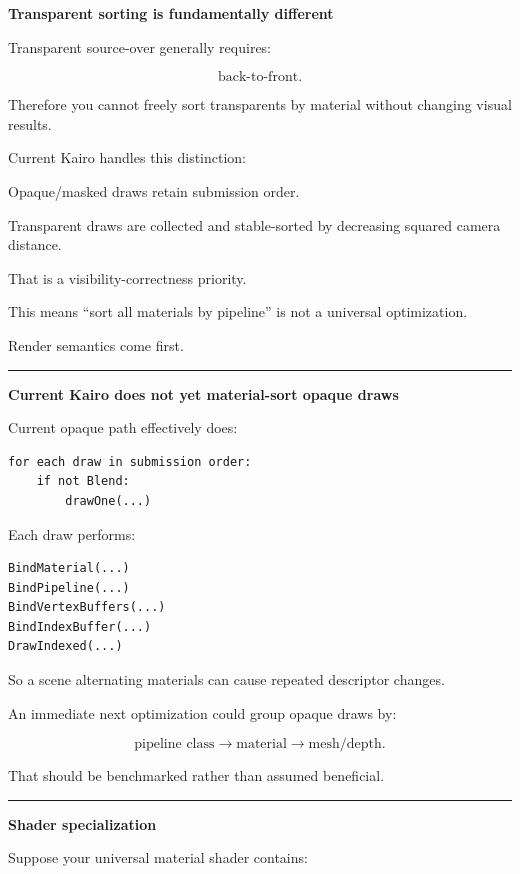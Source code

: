 \textbf{Transparent sorting is fundamentally different}

Transparent source-over generally requires:

\[
\text{back-to-front}.
\]

Therefore you cannot freely sort transparents by material without changing visual results.

Current Kairo handles this distinction:

Opaque/masked draws retain submission order.

Transparent draws are collected and stable-sorted by decreasing squared camera distance.

That is a visibility-correctness priority.

This means ``sort all materials by pipeline'' is not a universal optimization.

Render semantics come first.

\begin{center}\rule{0.5\linewidth}{0.5pt}\end{center}

\textbf{Current Kairo does not yet material-sort opaque draws}

Current opaque path effectively does:

\begin{verbatim}
for each draw in submission order:
    if not Blend:
        drawOne(...)
\end{verbatim}

Each draw performs:

\begin{verbatim}
BindMaterial(...)
BindPipeline(...)
BindVertexBuffers(...)
BindIndexBuffer(...)
DrawIndexed(...)
\end{verbatim}

So a scene alternating materials can cause repeated descriptor changes.

An immediate next optimization could group opaque draws by:

\[
\text{pipeline class}
\rightarrow
\text{material}
\rightarrow
\text{mesh/depth}.
\]

That should be benchmarked rather than assumed beneficial.

\begin{center}\rule{0.5\linewidth}{0.5pt}\end{center}

\textbf{Shader specialization}

Suppose your universal material shader contains:

